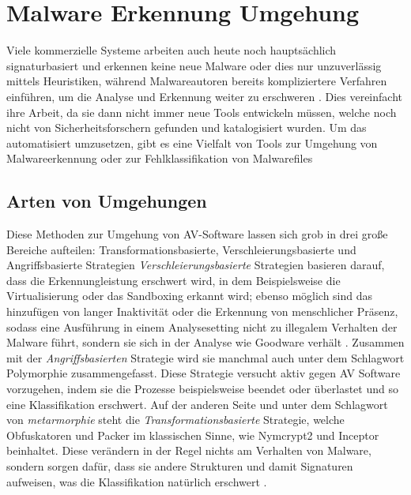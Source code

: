 \section{Malware Erkennung Umgehung}
Viele kommerzielle Systeme arbeiten auch heute noch hauptsächlich signaturbasiert und erkennen keine neue Malware oder dies nur unzuverlässig mittels Heuristiken\cite{rathore_2023_breaking}, während Malwareautoren bereits kompliziertere Verfahren einführen, um die Analyse und Erkennung weiter zu erschweren \cite{nunes_2022_bane}. Dies vereinfacht ihre Arbeit, da sie dann nicht immer neue Tools entwickeln müssen, welche noch nicht von Sicherheitsforschern gefunden und katalogisiert wurden\cite{holm_2023_hide}. Um das automatisiert umzusetzen, gibt es eine Vielfalt von Tools zur Umgehung von Malwareerkennung oder zur Fehlklassifikation von Malwarefiles 


\subsection{Arten von Umgehungen}
Diese Methoden zur Umgehung von AV-Software lassen sich grob in drei große Bereiche aufteilen: Transformationsbasierte, Verschleierungsbasierte und Angriffsbasierte Strategien \cite{geng_2024_a}
\textit{Verschleierungsbasierte} Strategien basieren darauf, dass die Erkennungleistung erschwert wird, in dem Beispielsweise die Virtualisierung oder das Sandboxing erkannt wird; ebenso möglich sind das hinzufügen von langer Inaktivität  oder die Erkennung von menschlicher Präsenz, sodass eine Ausführung in einem Analysesetting nicht zu illegalem Verhalten der Malware führt, sondern sie sich in der Analyse wie Goodware verhält \cite{geng_2024_a}. Zusammen mit der \textit{Angriffsbasierten} Strategie wird sie manchmal auch unter dem Schlagwort Polymorphie \cite{elsersy_2022_the} zusammengefasst. Diese Strategie versucht aktiv gegen AV Software vorzugehen, indem sie die Prozesse beispielsweise beendet oder überlastet und so eine Klassifikation erschwert\cite{geng_2024_a}. 
Auf der anderen Seite und unter dem Schlagwort von \textit{metarmorphie}\cite{elsersy_2022_the} steht die \textit{Transformationsbasierte} Strategie, welche Obfuskatoren und Packer im klassischen Sinne, wie Nymcrypt2 und Inceptor beinhaltet. Diese verändern in der Regel nichts am Verhalten von Malware\cite{wauters_2024_building}, sondern sorgen dafür, dass sie andere Strukturen und damit Signaturen aufweisen, was die Klassifikation natürlich erschwert \cite{geng_2024_a}.

